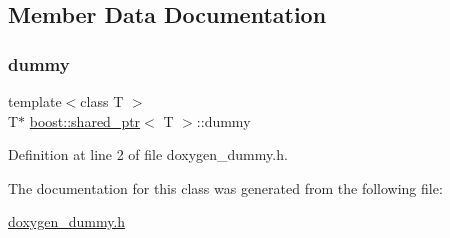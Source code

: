 \subsection{Member Data Documentation}
\mbox{\label{classboost_1_1shared__ptr_a3416b29d5681db8a7f22d4106c2d175b}} 
\subsubsection{\texorpdfstring{dummy}{dummy}}
{\footnotesize\ttfamily template$<$class T $>$ \\
T$\ast$ \hyperlink{classboost_1_1shared__ptr}{boost\+::shared\+\_\+ptr}$<$ T $>$\+::dummy\hspace{0.3cm}{\ttfamily [private]}}



Definition at line 2 of file doxygen\+\_\+dummy.\+h.



The documentation for this class was generated from the following file\+:\begin{DoxyCompactItemize}
\item 
\hyperlink{doxygen__dummy_8h}{doxygen\+\_\+dummy.\+h}\end{DoxyCompactItemize}
